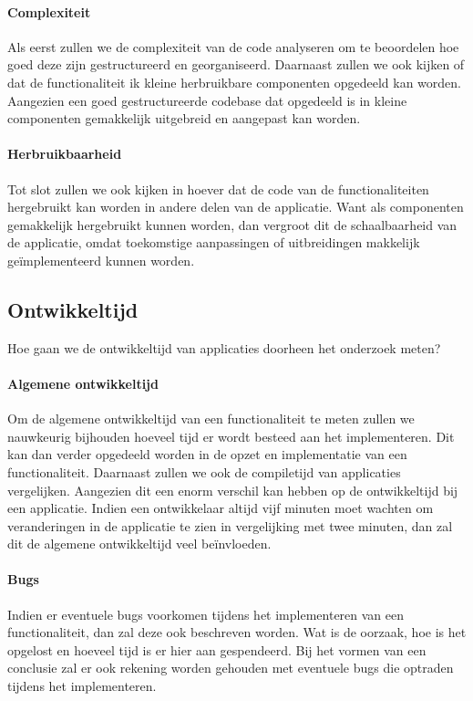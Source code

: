 \paragraph{Complexiteit}
Als eerst zullen we de complexiteit van de code analyseren om te beoordelen hoe goed deze zijn gestructureerd en georganiseerd.
Daarnaast zullen we ook kijken of dat de functionaliteit ik kleine herbruikbare componenten opgedeeld kan worden. Aangezien een 
goed gestructureerde codebase dat opgedeeld is in kleine componenten gemakkelijk uitgebreid en aangepast kan worden.

\paragraph{Herbruikbaarheid}
Tot slot zullen we ook kijken in hoever dat de code van de functionaliteiten hergebruikt kan worden in andere 
delen van de applicatie. Want als componenten gemakkelijk hergebruikt kunnen worden, dan vergroot dit de schaalbaarheid 
van de applicatie, omdat toekomstige aanpassingen of uitbreidingen makkelijk geïmplementeerd kunnen worden.

\subsection{Ontwikkeltijd}
Hoe gaan we de ontwikkeltijd van applicaties doorheen het onderzoek meten?

\paragraph{Algemene ontwikkeltijd}
Om de algemene ontwikkeltijd van een functionaliteit te meten zullen we nauwkeurig bijhouden hoeveel tijd er wordt 
besteed aan het implementeren. Dit kan dan verder opgedeeld worden in de opzet en implementatie van een functionaliteit. 
Daarnaast zullen we ook de compiletijd van applicaties vergelijken. Aangezien dit een enorm verschil kan hebben op de 
ontwikkeltijd bij een applicatie. Indien een ontwikkelaar altijd vijf minuten moet wachten om veranderingen in de applicatie 
te zien in vergelijking met twee minuten, dan zal dit de algemene ontwikkeltijd veel beïnvloeden.

\paragraph{Bugs}
Indien er eventuele bugs voorkomen tijdens het implementeren van een functionaliteit, dan zal deze ook beschreven worden. 
Wat is de oorzaak, hoe is het opgelost en hoeveel tijd is er hier aan gespendeerd. Bij het vormen van een conclusie zal er ook 
rekening worden gehouden met eventuele bugs die optraden tijdens het implementeren.